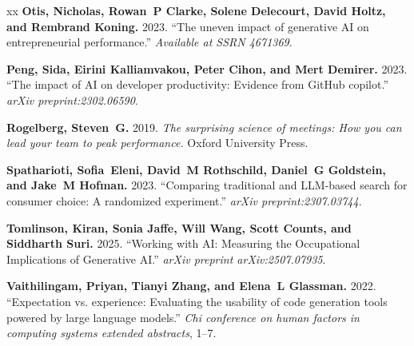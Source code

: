 \documentclass{article}
\renewcommand{\topfraction}{0.9}
\renewcommand{\floatpagefraction}{0.7}	%
\begin{document}
\begin{thebibliography}{xx}
{\bf Otis, Nicholas, Rowan~P Clarke, Solene Delecourt, David Holtz, and Rembrand Koning.} 2023. ``The uneven impact of generative AI on entrepreneurial performance.'' {\em Available at SSRN 4671369}.

{\bf Peng, Sida, Eirini Kalliamvakou, Peter Cihon, and Mert Demirer.} 2023. ``The impact of AI on developer productivity: Evidence from GitHub copilot.'' {\em arXiv preprint:2302.06590}.

{\bf Rogelberg, Steven~G.} 2019. {\em The surprising science of meetings: How you can lead your team to peak performance.} Oxford University Press.

{\bf Spatharioti, Sofia~Eleni, David~M Rothschild, Daniel~G Goldstein, and Jake~M Hofman.} 2023. ``Comparing traditional and LLM-based search for consumer choice: A randomized experiment.'' {\em arXiv preprint:2307.03744}.

{\bf Tomlinson, Kiran, Sonia Jaffe, Will Wang, Scott Counts, and Siddharth Suri.} 2025. ``Working with AI: Measuring the Occupational Implications of Generative AI.'' {\em arXiv preprint arXiv:2507.07935}.

{\bf Vaithilingam, Priyan, Tianyi Zhang, and Elena~L Glassman.} 2022. ``Expectation vs. experience: Evaluating the usability of code generation tools powered by large language models.'' {\em Chi conference on human factors in computing systems extended abstracts}, 1--7.

\end{thebibliography}






\clearpage
\newpage
\setcounter{table}{0}
\setcounter{figure}{0}
\setcounter{section}{0}

\renewcommand\thesection{\Alph{section}}
\renewcommand\thetable{\thesection.\arabic{table}}
\renewcommand\thefigure{\thesection.\arabic{figure}}
\renewcommand{\topfraction}{.9}
\renewcommand{\floatpagefraction}{.9}
\end{document}
